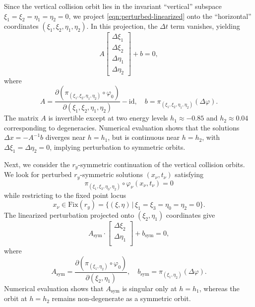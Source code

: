 \documentclass[pdflatex,sn-mathphys-ay]{sn-jnl}%
\theoremstyle{thmstyleone}%
\theoremstyle{thmstyletwo}%
\theoremstyle{thmstylethree}%
\renewcommand{\phi}{\varphi}
\begin{document}
Since the vertical collision orbit lies in the invariant ``vertical'' subspace $\xi_1=\xi_2=\eta_1=\eta_2=0$, we project \eqref{eqn:perturbed-linearized} onto the ``horizontal'' coordinates $(\xi_1, \xi_2, \eta_1, \eta_2)$. In this projection, the $\Delta t$ term vanishes, yielding
\begin{equation*}
    A 
    \begin{bmatrix}
        \Delta \xi_1 \\ 
        \Delta \xi_2 \\ 
        \Delta \eta_1 \\ 
        \Delta \eta_2
    \end{bmatrix}
    + b = 0,
\end{equation*}
where
\begin{equation*}
    A = \frac{\partial (\pi_{(\xi_1, \xi_2, \eta_1, \eta_2)} \circ \phi_0)}{\partial (\xi_1, \xi_2, \eta_1, \eta_2)} - \text{id},
    \quad
    b = \pi_{(\xi_1, \xi_2, \eta_1, \eta_2)} (\Delta \phi).
\end{equation*}
The matrix $A$ is invertible except at two energy levels $h_1\approx -0.85$ and $h_2\approx 0.04$ corresponding to degeneracies. Numerical evaluation shows that the solutions $\Delta x = -A^{-1}b$ diverges near $h=h_1$, but is continuous near $h=h_2$, with $\Delta \xi_1 = \Delta \eta_2 = 0$, implying perturbation to symmetric orbits.

Next, we consider the $r_y$-symmetric continuation of the vertical collision orbits. We look for perturbed $r_y$-symmetric solutions $(x_\nu, t_\nu)$ satisfying
\begin{equation*}
    \pi_{(\xi_1, \xi_3, \eta_0, \eta_2)} \circ \phi_\nu (x_\nu, t_\nu) = 0
\end{equation*}
while restricting to the fixed point locus
\[
    x_\nu \in \text{Fix}(r_y) = \{(\xi,\eta) \,|\,  \xi_1 = \xi_3 = \eta_0 = \eta_2 = 0\}.
\]
The linearized perturbation projected onto $(\xi_2, \eta_1)$ coordinates give
\begin{equation}
    \label{eqn:perturbed-symmetric-linearized-projected}
    A_{\text{sym}} \cdot 
    \begin{bmatrix}
        \Delta \xi_2 \\ 
        \Delta \eta_1 \\ 
    \end{bmatrix}
    + b_{\text{sym}} = 0,
\end{equation}
where
\begin{equation*}
    A_{\text{sym}} = \frac{\partial (\pi_{(\xi_1, \eta_2)} \circ \phi_0)}{\partial (\xi_2, \eta_1)},
    \quad
    b_{\text{sym}} = \pi_{(\xi_1, \eta_2)} (\Delta \phi).
\end{equation*}
Numerical evaluation shows that $A_{\text{sym}}$ is singular only at $h=h_1$, whereas the orbit at $h=h_2$ remains non-degenerate as a symmetric orbit.
\end{document}
